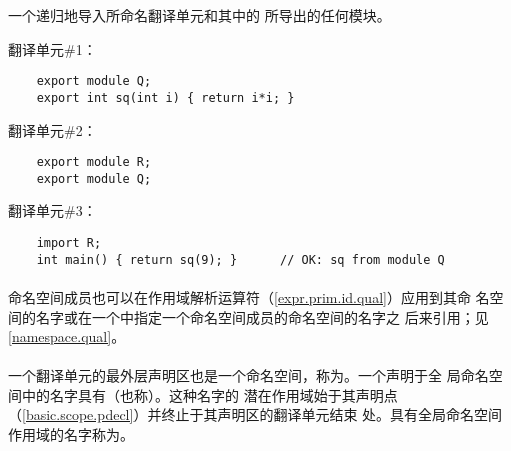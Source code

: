 \begin{note}
  一个递归地导入所命名翻译单元和其中的
  所导出的任何模块。

  \begin{example}

    翻译单元\#1：
  \begin{lstlisting}
    export module Q;
    export int sq(int i) { return i*i; }
  \end{lstlisting}
    翻译单元\#2：
  \begin{lstlisting}
    export module R;
    export module Q;
  \end{lstlisting}
    翻译单元\#3：
  \begin{lstlisting}
    import R;
    int main() { return sq(9); }      // OK: sq from module Q
  \end{lstlisting}

  \end{example}

\end{note}

\paragraph{} %
命名空间成员也可以在\tm{::}作用域解析运算符（\ref{expr.prim.id.qual}）应用到其命
名空间的名字或在一个中指定一个命名空间成员的命名空间的名字之
后来引用；见\ref{namespace.qual}。

\paragraph{} %
一个翻译单元的最外层声明区也是一个命名空间，称为。一个声明于全
局命名空间中的名字具有（也称）。这种名字的
潜在作用域始于其声明点（\ref{basic.scope.pdecl}）并终止于其声明区的翻译单元结束
处。具有全局命名空间作用域的名字称为。
